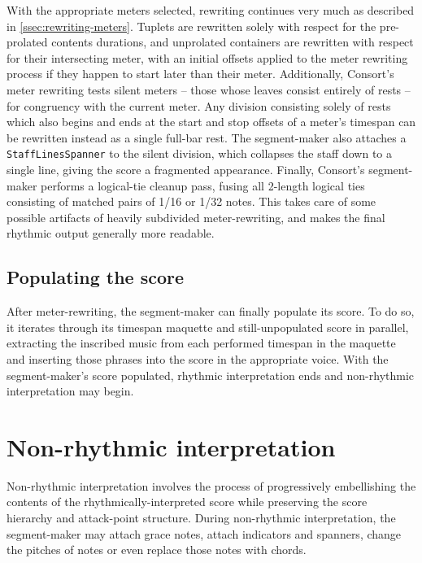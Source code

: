 \noindent With the appropriate meters selected, rewriting continues very much
as described in \autoref{ssec:rewriting-meters}. Tuplets are rewritten solely
with respect for the pre-prolated contents durations, and unprolated containers
are rewritten with respect for their intersecting meter, with an initial
offsets applied to the meter rewriting process if they happen to start later
than their meter. Additionally, Consort's meter rewriting tests silent meters
-- those whose leaves consist entirely of rests -- for congruency with the
current meter. Any division consisting solely of rests which also begins and
ends at the start and stop offsets of a meter's timespan can be rewritten
instead as a single full-bar rest. The segment-maker also attaches a
\texttt{StaffLinesSpanner} to the silent division, which collapses the staff
down to a single line, giving the score a fragmented appearance. Finally,
Consort's segment-maker performs a logical-tie cleanup pass, fusing all
2-length logical ties consisting of matched pairs of 1/16 or 1/32 notes. This
takes care of some possible artifacts of heavily subdivided meter-rewriting,
and makes the final rhythmic output generally more readable.

\subsection{Populating the score}
\label{ssec:populating-the-score}

After meter-rewriting, the segment-maker can finally populate its score. To do
so, it iterates through its timespan maquette and still-unpopulated score in
parallel, extracting the inscribed music from each performed timespan in the
maquette and inserting those phrases into the score in the appropriate voice.
With the segment-maker's score populated, rhythmic interpretation ends and
non-rhythmic interpretation may begin.

\section{Non-rhythmic interpretation}
\label{sec:non-rhythmic-interpretation}

Non-rhythmic interpretation involves the process of progressively embellishing
the contents of the rhythmically-interpreted score while preserving the score
hierarchy and attack-point structure. During non-rhythmic interpretation, the
segment-maker may attach grace notes, attach indicators and spanners, change
the pitches of notes or even replace those notes with chords.

